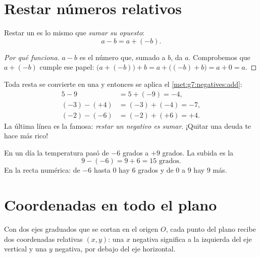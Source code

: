 \section{Restar números relativos}

\begin{theorem}\label{thm:g7:negatives:sub}
Restar un  es lo mismo que \emph{sumar su
opuesto}:
\[
a - b = a + (-b) .
\]
\end{theorem}

\begin{proof}[Por qué funciona]
$a - b$ es el número que, sumado a $b$, da $a$. Comprobemos que
$a + (-b)$ cumple ese papel:
$\bigl(a + (-b)\bigr) + b = a + \bigl((-b) + b\bigr) = a + 0 = a$.
\end{proof}

\begin{example}\label{ex:g7:negatives:sub}
Toda resta se convierte en una  y entonces se aplica el
\cref{met:g7:negatives:add}:
\begin{align*}
5 - 9 &= 5 + (-9) = -4, \\
(-3) - (+4) &= (-3) + (-4) = -7, \\
(-2) - (-6) &= (-2) + (+6) = +4 .
\end{align*}
La última línea es la famosa: \emph{restar un negativo es
sumar}. ¡Quitar una deuda te hace más rico!
\end{example}

\begin{example}\label{ex:g7:negatives:temperature}
En un día la temperatura pasó de $-6$ grados a $+9$ grados. La
subida es la 
\[
9 - (-6) = 9 + 6 = 15 \text{ grados}.
\]
En la recta numérica: de $-6$ hasta $0$ hay $6$ grados y de $0$ a
$9$ hay $9$ más.
\end{example}

\section{Coordenadas en todo el plano}

\begin{definition}\label{def:g7:negatives:coords}
Con dos ejes graduados  que se cortan en el origen $O$,
cada punto del plano recibe dos coordenadas relativas $(x, y)$:
una $x$ negativa significa a la izquierda del eje vertical y una $y$ negativa, por debajo
del eje horizontal.
\end{definition}

